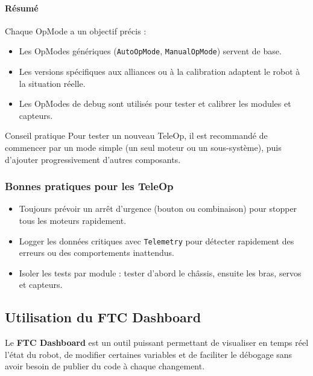 \documentclass[12pt, a4paper]{report}
\begin{document}
    \paragraph{Résumé}

    Chaque OpMode a un objectif précis :
    \begin{itemize}
        \item Les OpModes génériques (\texttt{AutoOpMode}, \texttt{ManualOpMode}) servent de base.
        \item Les versions spécifiques aux alliances ou à la calibration adaptent le robot à la situation réelle.
        \item Les OpModes de debug sont utilisés pour tester et calibrer les modules et capteurs.
    \end{itemize}

    \begin{myinfo}{Conseil pratique}
        Pour tester un nouveau TeleOp, il est recommandé de commencer par un mode simple (un seul moteur ou un sous-système), puis d’ajouter progressivement d’autres composants.
    \end{myinfo}

    \subsubsection*{Bonnes pratiques pour les TeleOp}

    \begin{itemize}
        \item Toujours prévoir un arrêt d’urgence (bouton ou combinaison) pour stopper tous les moteurs rapidement.
        \item Logger les données critiques avec \texttt{Telemetry} pour détecter rapidement des erreurs ou des comportements inattendus.
        \item Isoler les tests par module : tester d’abord le châssis, ensuite les bras, servos et capteurs.
    \end{itemize}

    \subsection{Utilisation du FTC Dashboard}

    Le \textbf{FTC Dashboard} est un outil puissant permettant de visualiser en temps réel l'état du robot, de modifier certaines variables et de faciliter le débogage sans avoir besoin de publier du code à chaque changement.
\end{document}
